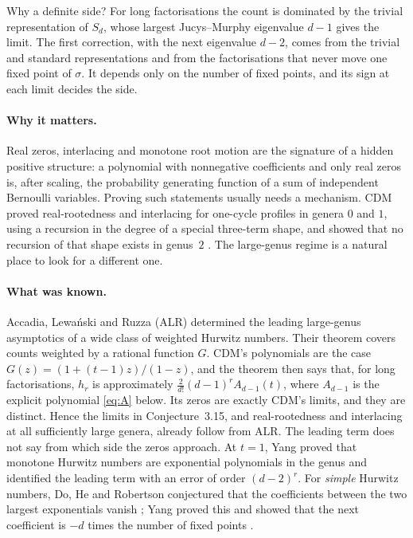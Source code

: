 \documentclass[11pt,a4paper]{article}
\theoremstyle{definition}\newtheorem{definition}[theorem]{Definition}
\theoremstyle{remark}\newtheorem{remark}[theorem]{Remark}\newtheorem{example}[theorem]{Example}
\numberwithin{equation}{section}
\begin{document}
Why a definite side? For long factorisations the count is dominated by the trivial representation of $S_d$, whose largest Jucys--Murphy eigenvalue $d-1$ gives the limit. The first correction, with the next eigenvalue $d-2$, comes from the trivial and standard representations and from the factorisations that never move one fixed point of $\sigma$. It depends only on the number of fixed points, and its sign at each limit decides the side.

\paragraph{Why it matters.}
Real zeros, interlacing and monotone root motion are the signature of a hidden positive structure: a polynomial with nonnegative coefficients and only real zeros is, after scaling, the probability generating function of a sum of independent Bernoulli variables. Proving such statements usually needs a mechanism. CDM proved real-rootedness and interlacing for one-cycle profiles in genera $0$ and $1$, using a recursion in the degree of a special three-term shape, and showed that no recursion of that shape exists in genus~$2$ \cite[Proposition~3.17 and Remark~3.18]{cdm}. The large-genus regime is a natural place to look for a different one.

\paragraph{What was known.}
Accadia, Lewa\'nski and Ruzza (ALR) \cite{alr} determined the leading large-genus asymptotics of a wide class of weighted Hurwitz numbers. Their theorem covers counts weighted by a rational function $G$. CDM's polynomials are the case $G(z)=(1+(t-1)z)/(1-z)$, and the theorem then says that, for long factorisations, $h_r$ is approximately $\frac{2}{d!}(d-1)^rA_{d-1}(t)$, where $A_{d-1}$ is the explicit polynomial \eqref{eq:A} below. Its zeros are exactly CDM's limits, and they are distinct. Hence the limits in Conjecture~3.15, and real-rootedness and interlacing at all sufficiently large genera, already follow from ALR. The leading term does not say from which side the zeros approach. At $t=1$, Yang \cite[Theorem~1.1 and Proposition~1.2]{yang} proved that monotone Hurwitz numbers are exponential polynomials in the genus and identified the leading term with an error of order $(d-2)^r$. For \emph{simple} Hurwitz numbers, Do, He and Robertson conjectured that the coefficients between the two largest exponentials vanish \cite[Conjecture~4.1]{dhr}; Yang proved this and showed that the next coefficient is $-d$ times the number of fixed points \cite[Theorem~1.3]{yang}.
\end{document}
